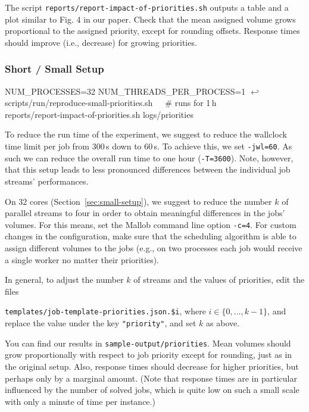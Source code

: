 \documentclass[runningheads]{article}
\newcommand{\CR}{{\tiny$\hookleftarrow$}}
\numberwithin{dummy}{subsection}
\begin{document}
The script \texttt{reports/report-impact-of-priorities.sh} outputs a table and a plot similar to Fig. 4 in our paper.
Check that the mean assigned volume grows proportional to the assigned priority, except for rounding offsets.
Response times should improve (i.e., decrease) for growing priorities.

\subsubsection{Short / Small Setup}

\begin{tcolorbox}[
  colback=Magenta!5!white,
  colframe=Magenta!75!black,
  title={\centering Commands for Small Setup}]
\begin{ttfenvcompact}
NUM\_PROCESSES=32 NUM\_THREADS\_PER\_PROCESS=1 \CR\\
\hspace*{0.3cm}scripts/run/reproduce-small-priorities.sh\ \ \ \# runs for 1\,h\\
reports/report-impact-of-priorities.sh logs/priorities
\end{ttfenvcompact}
\end{tcolorbox}

To reduce the run time of the experiment, we suggest to reduce the wallclock time limit per job from 300\,s down to 60\,s.
To achieve this, we set \texttt{-jwl=60}.
As such we can reduce the overall run time to one hour (\texttt{-T=3600}).
Note, however, that this setup leads to less pronounced differences between the individual job streams' performances.

On 32 cores (Section~\ref{sec:small-setup}), we suggest to reduce the number $k$ of parallel streams to four in order to obtain meaningful differences in the jobs' volumes.
For this means, set the Mallob command line option \texttt{-c=4}.
For custom changes in the configuration, make sure that the scheduling algorithm is able to assign different volumes to the jobs (e.g., on two processes each job would receive a single worker no matter their priorities).

In general, to adjust the number $k$ of streams and the values of priorities, edit the files 

\texttt{templates/job-template-priorities.json.\$i}, where $i \in \{0,\ldots,k-1\}$, and replace the value under the key \texttt{"priority"}, and set $k$ as above. 

You can find our results in \texttt{sample-output/priorities}.
Mean volumes should grow proportionally with respect to job priority except for rounding, just as in the original setup.
Also, response times should decrease for higher priorities, but perhaps only by a marginal amount.
(Note that response times are in particular influenced by the number of solved jobs, which is quite low on such a small scale with only a minute of time per instance.)
\end{document}
